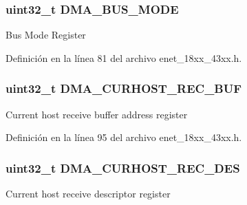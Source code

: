\subsubsection[{\texorpdfstring{D\+M\+A\+\_\+\+B\+U\+S\+\_\+\+M\+O\+DE}{DMA_BUS_MODE}}]{ uint32\+\_\+t D\+M\+A\+\_\+\+B\+U\+S\+\_\+\+M\+O\+DE}\hypertarget{struct_l_p_c___e_n_e_t___t_a91a9de6714bfb2f4092319e6213b6fda}{}\label{struct_l_p_c___e_n_e_t___t_a91a9de6714bfb2f4092319e6213b6fda}
Bus Mode Register 

Definición en la línea 81 del archivo enet\+\_\+18xx\+\_\+43xx.\+h.

\subsubsection[{\texorpdfstring{D\+M\+A\+\_\+\+C\+U\+R\+H\+O\+S\+T\+\_\+\+R\+E\+C\+\_\+\+B\+UF}{DMA_CURHOST_REC_BUF}}]{ uint32\+\_\+t D\+M\+A\+\_\+\+C\+U\+R\+H\+O\+S\+T\+\_\+\+R\+E\+C\+\_\+\+B\+UF}\hypertarget{struct_l_p_c___e_n_e_t___t_a6b18526fc348ba9b375236583e9fe7e4}{}\label{struct_l_p_c___e_n_e_t___t_a6b18526fc348ba9b375236583e9fe7e4}
Current host receive buffer address register 

Definición en la línea 95 del archivo enet\+\_\+18xx\+\_\+43xx.\+h.

\subsubsection[{\texorpdfstring{D\+M\+A\+\_\+\+C\+U\+R\+H\+O\+S\+T\+\_\+\+R\+E\+C\+\_\+\+D\+ES}{DMA_CURHOST_REC_DES}}]{ uint32\+\_\+t D\+M\+A\+\_\+\+C\+U\+R\+H\+O\+S\+T\+\_\+\+R\+E\+C\+\_\+\+D\+ES}\hypertarget{struct_l_p_c___e_n_e_t___t_aecef9f7800c06899023606cc352b151b}{}\label{struct_l_p_c___e_n_e_t___t_aecef9f7800c06899023606cc352b151b}
Current host receive descriptor register 


